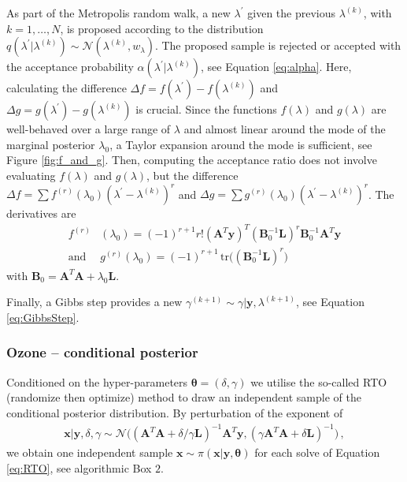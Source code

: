 As part of the Metropolis random walk, a new $\lambda^\prime$ given the previous $\lambda^{(k)}$, with $k = 1 , \dots, N$, is proposed according to the distribution $q(\lambda^\prime|\lambda^{(k)}) \sim \mathcal{N}(\lambda^{(k)}, w_\lambda)$.
The proposed sample is rejected or accepted with the acceptance probability $\alpha(\lambda^\prime |\lambda^{(k)})$, see Equation \eqref{eq:alpha}.
Here, calculating the difference $\Delta f = f(\lambda^\prime) - f(\lambda^{(k)})$ and $\Delta g = g(\lambda^\prime) - g(\lambda^{(k)})$ is crucial.
Since the functions $f(\lambda)$ and $g(\lambda)$ are well-behaved over a large range of $\lambda$ and almost linear around the mode of the marginal posterior $\lambda_0$, a Taylor expansion around the mode is sufficient, see Figure \ref{fig:f_and_g}.
Then, computing the acceptance ratio does not involve evaluating $f(\lambda)$ and $g(\lambda)$, but the difference $\Delta f = \sum f^{(r)}(\lambda_0) (\lambda^\prime - \lambda^{(k)})^r$ and $\Delta g = \sum g^{(r)}(\lambda_0) (\lambda^\prime - \lambda^{(k)})^{r}$.
The derivatives are
\begin{align}
	f^{(r)}& (\lambda_0)= (-1)^{r+1} r! (\bm{A}^T \bm{y})^T (\bm{B}_0^{-1} \bm{L})^r \bm{B}_0^{-1} \bm{A}^T \bm{y} \label{eq:ftay}  \\
	\text{and } &g^{(r)} ( \lambda_0) = (-1)^{r+1} \, \text{tr} \big( (\bm{B}_0^{-1}\bm{ L })^r \big)
	\label{eq:gtay}
\end{align} 
with $\bm{B}_0 = \bm{A}^T  \bm{A} + \lambda_0 \bm{L}$.

Finally, a Gibbs step provides a new $\gamma^{(k+1)} \sim \gamma | \bm{y}, \lambda^{(k+1)}$, see Equation \eqref{eq:GibbsStep}.


\subsubsection{Ozone -- conditional posterior}

Conditioned on the hyper-parameters $\bm{\theta} = ( \delta, \gamma)$ we utilise the so-called RTO (randomize then optimize) method \cite{bardsley2012mcmc,bardsley2015randomize, fox2016fast} to draw an independent sample of the conditional posterior distribution.
By perturbation of the exponent of
\begin{align}
	\bm{x}| \bm{y} ,\delta, \gamma \sim \mathcal{N}\big(  (\bm{A}^T \bm{A} + \delta / \gamma \bm{L} )^{-1} \bm{A}^T \bm{y}, (\gamma \bm{A}^T \bm{A} + \delta \bm{L} )^{-1} \big) \, \label{eq:CondPost},
\end{align}
we obtain one independent sample $\bm{x} \sim \pi(\bm{x}|\bm{y}, \bm{\theta})$ for each solve of Equation \eqref{eq:RTO}, see algorithmic Box $2$.


